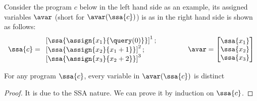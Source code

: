 Consider the program $c$ below in the left hand side as an example, its assigned variables $\avar$ (short for $\avar(\ssa{c})$) is as in the right hand side is shown as follows:
$$
\ssa{c} = 
\begin{array}{l}
\left[\ssa{\assign {x_1} {\query(0)}}		\right]^1;
\\
\left[\ssa{\assign {x_2} {x_1 + 1}}		\right]^2;
\\
\left[\ssa{\assign {x_3} {x_2 + 2}}		\right]^3
\end{array}
~~~~~~~~~~~~
\avar = \left [ 
\begin{matrix}
\ssa{x_1} \\
\ssa{x_2} \\
\ssa{x_3} \\
\end{matrix} \right ]
$$
%
\begin{lem}
For any program $\ssa{c}$, every variable in $\avar(\ssa{c})$ is distinct
\end{lem}
\begin{proof}
 It is due to the SSA nature. We can prove it by induction on $\ssa{c}$.
\end{proof}

